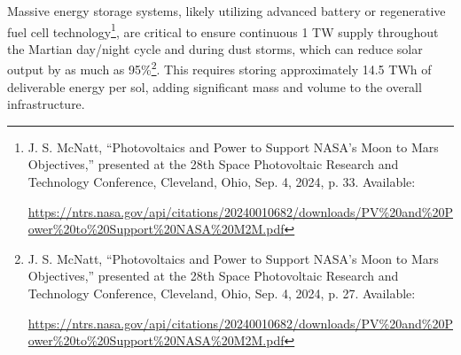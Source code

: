 \documentclass[fontsize=10pt, oneside, DIV=calc]{scrartcl}
\begin{document}
\medskip

\noindent
Massive energy storage systems, likely utilizing advanced battery or regenerative fuel cell technology\footnote{J. S. McNatt, ``Photovoltaics and Power to Support NASA’s Moon to Mars Objectives,'' presented at the 28th Space Photovoltaic Research and Technology Conference, Cleveland, Ohio, Sep. 4, 2024, p. 33. Available:








\href{https://ntrs.nasa.gov/api/citations/20240010682/downloads/PV\%20and\%20Power\%20to\%20Support\%20NASA\%20M2M.pdf}\url{https://ntrs.nasa.gov/api/citations/20240010682/downloads/PV\%20and\%20Power\%20to\%20Support\%20NASA\%20M2M.pdf}}, are critical to ensure continuous 1 TW supply throughout the Martian day/night cycle and during dust storms, which can reduce solar output by as much as 95\%\footnote{J. S. McNatt, ``Photovoltaics and Power to Support NASA’s Moon to Mars Objectives,'' presented at the 28th Space Photovoltaic Research and Technology Conference, Cleveland, Ohio, Sep. 4, 2024, p. 27. Available:








\href{https://ntrs.nasa.gov/api/citations/20240010682/downloads/PV\%20and\%20Power\%20to\%20Support\%20NASA\%20M2M.pdf}\url{https://ntrs.nasa.gov/api/citations/20240010682/downloads/PV\%20and\%20Power\%20to\%20Support\%20NASA\%20M2M.pdf}}. This requires storing approximately 14.5 TWh of deliverable energy per sol, adding significant mass and volume to the overall infrastructure.

\medskip
\end{document}
